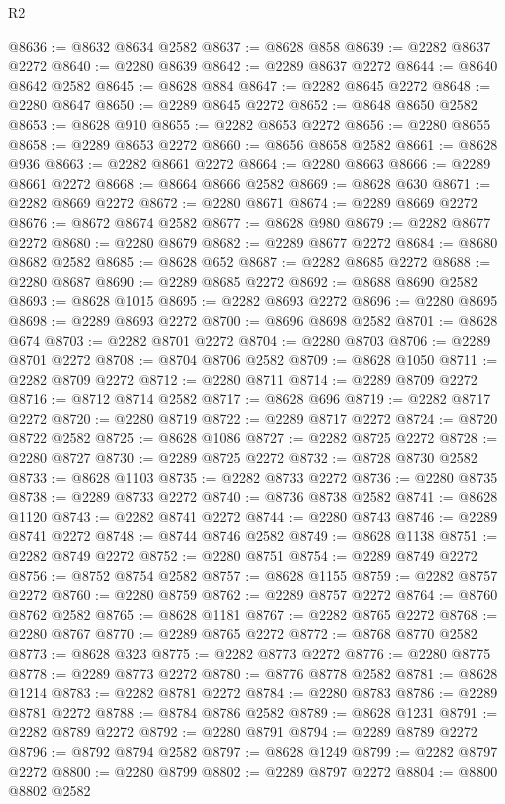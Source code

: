 \begin{lexlean}{R2}
\begin{coremodule}
@8636 := @8632 @8634 @2582
@8637 := @8628 @858
@8639 := @2282 @8637 @2272
@8640 := @2280 @8639
@8642 := @2289 @8637 @2272
@8644 := @8640 @8642 @2582
@8645 := @8628 @884
@8647 := @2282 @8645 @2272
@8648 := @2280 @8647
@8650 := @2289 @8645 @2272
@8652 := @8648 @8650 @2582
@8653 := @8628 @910
@8655 := @2282 @8653 @2272
@8656 := @2280 @8655
@8658 := @2289 @8653 @2272
@8660 := @8656 @8658 @2582
@8661 := @8628 @936
@8663 := @2282 @8661 @2272
@8664 := @2280 @8663
@8666 := @2289 @8661 @2272
@8668 := @8664 @8666 @2582
@8669 := @8628 @630
@8671 := @2282 @8669 @2272
@8672 := @2280 @8671
@8674 := @2289 @8669 @2272
@8676 := @8672 @8674 @2582
@8677 := @8628 @980
@8679 := @2282 @8677 @2272
@8680 := @2280 @8679
@8682 := @2289 @8677 @2272
@8684 := @8680 @8682 @2582
@8685 := @8628 @652
@8687 := @2282 @8685 @2272
@8688 := @2280 @8687
@8690 := @2289 @8685 @2272
@8692 := @8688 @8690 @2582
@8693 := @8628 @1015
@8695 := @2282 @8693 @2272
@8696 := @2280 @8695
@8698 := @2289 @8693 @2272
@8700 := @8696 @8698 @2582
@8701 := @8628 @674
@8703 := @2282 @8701 @2272
@8704 := @2280 @8703
@8706 := @2289 @8701 @2272
@8708 := @8704 @8706 @2582
@8709 := @8628 @1050
@8711 := @2282 @8709 @2272
@8712 := @2280 @8711
@8714 := @2289 @8709 @2272
@8716 := @8712 @8714 @2582
@8717 := @8628 @696
@8719 := @2282 @8717 @2272
@8720 := @2280 @8719
@8722 := @2289 @8717 @2272
@8724 := @8720 @8722 @2582
@8725 := @8628 @1086
@8727 := @2282 @8725 @2272
@8728 := @2280 @8727
@8730 := @2289 @8725 @2272
@8732 := @8728 @8730 @2582
@8733 := @8628 @1103
@8735 := @2282 @8733 @2272
@8736 := @2280 @8735
@8738 := @2289 @8733 @2272
@8740 := @8736 @8738 @2582
@8741 := @8628 @1120
@8743 := @2282 @8741 @2272
@8744 := @2280 @8743
@8746 := @2289 @8741 @2272
@8748 := @8744 @8746 @2582
@8749 := @8628 @1138
@8751 := @2282 @8749 @2272
@8752 := @2280 @8751
@8754 := @2289 @8749 @2272
@8756 := @8752 @8754 @2582
@8757 := @8628 @1155
@8759 := @2282 @8757 @2272
@8760 := @2280 @8759
@8762 := @2289 @8757 @2272
@8764 := @8760 @8762 @2582
@8765 := @8628 @1181
@8767 := @2282 @8765 @2272
@8768 := @2280 @8767
@8770 := @2289 @8765 @2272
@8772 := @8768 @8770 @2582
@8773 := @8628 @323
@8775 := @2282 @8773 @2272
@8776 := @2280 @8775
@8778 := @2289 @8773 @2272
@8780 := @8776 @8778 @2582
@8781 := @8628 @1214
@8783 := @2282 @8781 @2272
@8784 := @2280 @8783
@8786 := @2289 @8781 @2272
@8788 := @8784 @8786 @2582
@8789 := @8628 @1231
@8791 := @2282 @8789 @2272
@8792 := @2280 @8791
@8794 := @2289 @8789 @2272
@8796 := @8792 @8794 @2582
@8797 := @8628 @1249
@8799 := @2282 @8797 @2272
@8800 := @2280 @8799
@8802 := @2289 @8797 @2272
@8804 := @8800 @8802 @2582

\end{coremodule}
\end{lexlean}

